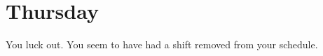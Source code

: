 \documentclass[../main.tex]{subfiles}
\begin{document}
\section{Thursday}

You luck out. You seem to have had a shift removed from your schedule.  
\end{document}
